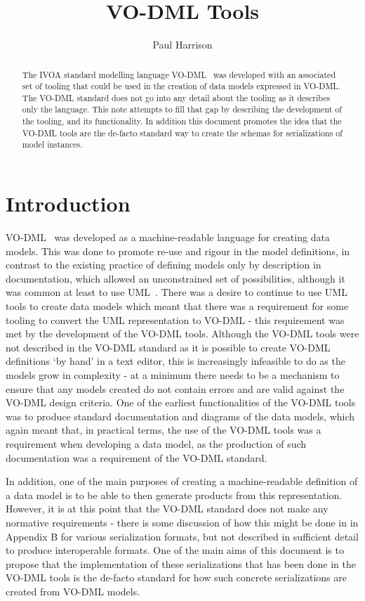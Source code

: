 \documentclass[11pt,a4paper]{ivoa}
\title{VO-DML Tools}
\author[https://www.ivoa.net/cgi-bin/twiki/bin/view/IVOA/PaulHarrison]{Paul Harrison}
\begin{document}
\begin{abstract}
    The IVOA standard modelling language VO-DML~\cite{2018ivoa.spec.0910L} was developed
    with an associated set of tooling that could be used in the creation of data models
    expressed in VO-DML. The VO-DML standard does not go into any detail about the tooling
    as it describes only the language.
    This note attempts to fill that gap by describing the
    development of the tooling, and its functionality.
    In addition this document promotes the idea that the VO-DML tools are the de-facto standard way to create the
    schemas for serializations of model instances.
\end{abstract}



\section{Introduction}

VO-DML~\cite{2018ivoa.spec.0910L} was developed as a machine-readable language for creating data models.
This was done to promote re-use and rigour in the model definitions, in contrast to the existing practice of
defining models only by description in documentation, which allowed an unconstrained set of possibilities, although
it was common at least to use UML~\cite{std:uml}.
There was a desire to continue to use UML tools to create data models which meant that there was a requirement for
some tooling to convert the UML representation to VO-DML - this requirement was met by the development of the VO-DML tools.
Although the VO-DML tools were not described in the VO-DML standard as it is possible to create VO-DML definitions `by hand' in a text editor,
this is increasingly infeasible to do as the models grow in complexity - at a minimum there needs to be a mechanism to
ensure that any models created do not contain errors and are valid against the VO-DML design criteria.
One of the earliest functionalities of the VO-DML tools was to produce standard documentation and diagrams of the data models,
which again meant that, in practical terms, the use of the VO-DML tools was a requirement when developing a data model, as
the production of such documentation was a requirement of the VO-DML standard.

In addition, one of the main purposes of creating a machine-readable definition of a data model is to be able to
then generate products from this representation.
However, it is at this point that the VO-DML standard does not make any normative requirements - there is some discussion of how this might be done in
in Appendix B for various serialization formats, but not described in sufficient detail to produce interoperable formats.
One of the main aims of this document is to propose that the implementation of these serializations that has been done in the VO-DML
tools is the de-facto standard for how such concrete serializations are created from VO-DML models.
\end{document}
